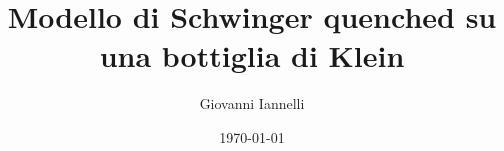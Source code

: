 \title{Modello di Schwinger quenched su una bottiglia di Klein} %

\author{Giovanni Iannelli} %
\date{\today} %

\maketitle
